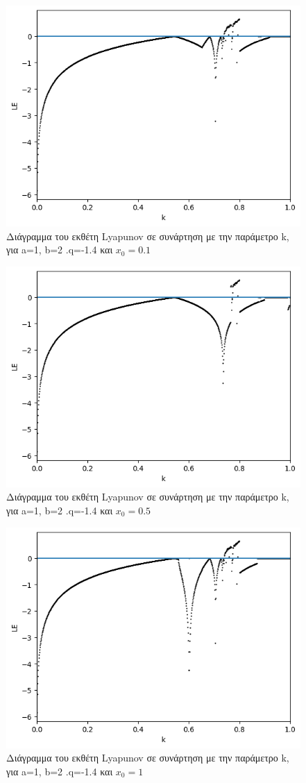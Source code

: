 \begin{figure}[h!]
	\centering
	\includegraphics[width=0.6\linewidth]{LateX images/graphs q14/g6}
	\caption{Διάγραμμα του εκθέτη Lyapunov σε συνάρτηση με την παράμετρο k, για a=1, b=2 .q=-1.4 και \(x_0=0.1\)}
	\label{f:g23}
\end{figure}

\begin{figure}[h!]
	\centering
	\includegraphics[width=0.6\linewidth]{LateX images/graphs q14/g7}
	\caption{Διάγραμμα του εκθέτη Lyapunov σε συνάρτηση με την παράμετρο k, για a=1, b=2 .q=-1.4 και \(x_0=0.5\)}
	\label{f:g24}
\end{figure}

\begin{figure}[h!]
	\centering
	\includegraphics[width=0.6\linewidth]{LateX images/graphs q14/g8}
	\caption{Διάγραμμα του εκθέτη Lyapunov σε συνάρτηση με την παράμετρο k, για a=1, b=2 .q=-1.4 και \(x_0=1\)}
	\label{f:g25}
\end{figure}

